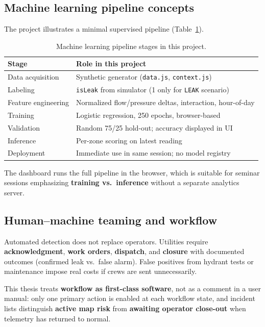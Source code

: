 \documentclass[12pt,a4paper]{article}
\begin{document}
\subsection{Machine learning pipeline concepts}

The project illustrates a minimal supervised pipeline (Table~\ref{tab:ml-pipeline}).

\begin{table}[htbp]
\centering
\caption{Machine learning pipeline stages in this project.}
\label{tab:ml-pipeline}
\begin{tabular}{@{}ll@{}}
\toprule
\textbf{Stage} & \textbf{Role in this project} \\
\midrule
Data acquisition & Synthetic generator (\texttt{data.js}, \texttt{context.js}) \\
Labeling & \texttt{isLeak} from simulator (1 only for \texttt{LEAK} scenario) \\
Feature engineering & Normalized flow/pressure deltas, interaction, hour-of-day \\
Training & Logistic regression, 250 epochs, browser-based \\
Validation & Random 75/25 hold-out; accuracy displayed in UI \\
Inference & Per-zone scoring on latest reading \\
Deployment & Immediate use in same session; no model registry \\
\bottomrule
\end{tabular}
\end{table}

The dashboard runs the full pipeline in the browser, which is suitable for seminar sessions emphasizing \textbf{training vs.\ inference} without a separate analytics server.

\subsection{Human--machine teaming and workflow}

Automated detection does not replace operators. Utilities require \textbf{acknowledgment}, \textbf{work orders}, \textbf{dispatch}, and \textbf{closure} with documented outcomes (confirmed leak vs.\ false alarm). False positives from hydrant tests or maintenance impose real costs if crews are sent unnecessarily.

This thesis treats \textbf{workflow as first-class software}, not as a comment in a user manual: only one primary action is enabled at each workflow state, and incident lists distinguish \textbf{active map risk} from \textbf{awaiting operator close-out} when telemetry has returned to normal.
\end{document}
